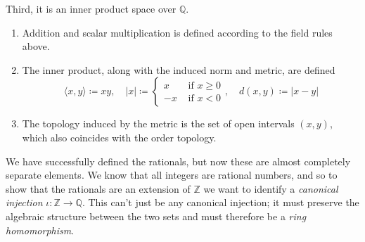   \begin{theorem}
    Third, it is an inner product space over $\mathbb{Q}$. 
    \begin{enumerate}
      \item Addition and scalar multiplication is defined according to the field rules above. 
      \item The inner product, along with the induced norm and metric, are defined
      \begin{equation}
        \langle x, y \rangle \coloneqq xy, \quad |x| \coloneqq \begin{cases} x & \text{ if } x \geq 0 \\ -x & \text{ if } x < 0 \end{cases}, \quad d(x, y) \coloneqq |x - y|
      \end{equation}
      \item The topology induced by the metric is the set of open intervals $(x, y)$, which also coincides with the order topology. 
    \end{enumerate}
  \end{theorem}

  We have successfully defined the rationals, but now these are almost completely separate elements. We know that all integers are rational numbers, and so to show that the rationals are an extension of $\mathbb{Z}$ we want to identify a \textit{canonical injection} $\iota: \mathbb{Z} \rightarrow \mathbb{Q}$. This can't just be any canonical injection; it must preserve the algebraic structure between the two sets and must therefore be a \textit{ring homomorphism}. 

